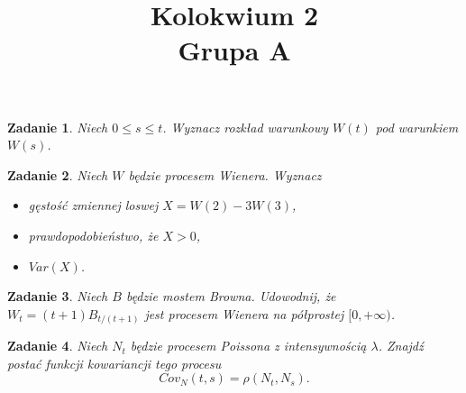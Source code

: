 \documentclass{mwart}
\title{Kolokwium 2\\Grupa A}
\newtheorem{zd}{Zadanie}
\begin{document}

\maketitle
\begin{zd}
Niech $0 \leq s \leq t$. Wyznacz rozkład warunkowy $W(t)$ pod warunkiem $W(s)$.
\end{zd}

\begin{zd}
Niech $W$ będzie procesem Wienera. Wyznacz
\begin{itemize}
\item gęstość zmiennej loswej $X = W(2) - 3W(3)$,
\item prawdopodobieństwo, że $X > 0$,
\item $Var(X)$.
\end{itemize}
\end{zd}

\begin{zd}
Niech $B$ będzie mostem Browna. Udowodnij, że $W_t = (t+1)B_{t/(t+1)}$ jest procesem Wienera na półprostej $[0, +\infty)$.
\end{zd}

\begin{zd}
Niech $N_t$ będzie procesem Poissona z intensywnością $\lambda$. Znajdź postać funkcji  kowariancji tego procesu
\begin{displaymath}
	Cov_N(t,s) = \rho\left(N_t, N_s\right).
\end{displaymath}
\end{zd}
\end{document}
